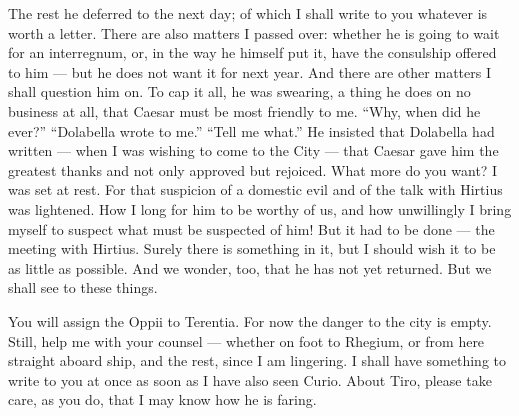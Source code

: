  The rest he deferred to the next day; of which I shall write to you whatever is worth a letter. There are also matters I passed over: whether he is going to wait for an interregnum, or, in the way he himself put it, have the consulship offered to him --- but he does not want it for next year. And there are other matters I shall question him on. To cap it all, he was swearing, a thing he does on no business at all, that Caesar must be most friendly to me. ``Why, when did he ever?'' ``Dolabella wrote to me.'' ``Tell me what.'' He insisted that Dolabella had written --- when I was wishing to come to the City --- that Caesar gave him the greatest thanks and not only approved but rejoiced. What more do you want? I was set at rest. For that suspicion of a domestic evil and of the talk with Hirtius was lightened. How I long for him to be worthy of us, and how unwillingly I bring myself to suspect \dag{}what must be suspected of him\dag{}! But it had to be done --- the meeting with Hirtius. Surely there is something in it, but I should wish it to be as little as possible. And we wonder, too, that he has not yet returned. But we shall see to these things.

 You will assign the Oppii to Terentia. For now the danger to the city is empty. Still, help me with your counsel --- whether on foot to Rhegium, or from here straight aboard ship, and the rest, since I am lingering. I shall have something to write to you at once as soon as I have also seen Curio. About Tiro, please take care, as you do, that I may know how he is faring.

